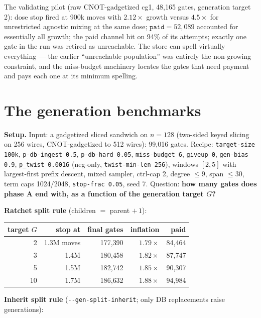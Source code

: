 \documentclass[11pt]{article}
\newcommand{\code}[1]{\texttt{#1}}
\begin{document}
The validating pilot (raw CNOT-gadgetized cg1, 48{,}165 gates, generation
target 2): dose stop fired at 900k moves with $2.12\times$ growth versus
$4.5\times$ for unrestricted agnostic mixing at the same dose;
$\code{paid}=52{,}089$ accounted for essentially all growth; the paid
channel hit on 94\% of its attempts; exactly one gate in the run was
retired as unreachable. The store can spell virtually everything --- the
earlier ``unreachable population'' was entirely the non-growing constraint,
and the miss-budget machinery locates the gates that need payment and pays
each one at its minimum spelling.

\section{The generation benchmarks}
\textbf{Setup.} Input: a gadgetized sliced sandwich on $n=128$ (two-sided
keyed slicing on 256 wires, CNOT-gadgetized to 512 wires): 99{,}016 gates.
Recipe: \code{target-size 100k}, \code{p-db-ingest 0.5},
\code{p-db-hard 0.05}, \code{miss-budget 6}, \code{giveup 0},
\code{gen-bias 0.9}, \code{p\_twist 0.0016} (neg-only,
\code{twist-min-len 256}), windows $[2,5]$ with largest-first prefix
descent, mixed sampler, ctrl-cap 2, degree $\leq 9$, span $\leq 30$, term
caps 1024/2048, \code{stop-frac 0.05}, seed 7. Question: \textbf{how many
gates does phase A end with, as a function of the generation target $G$?}

\medskip
\noindent\textbf{Ratchet split rule} (children $=$ parent $+\,1$):

\begin{center}
\begin{tabular}{rrrrr}
\toprule
target $G$ & stop at & final gates & inflation & paid \\
\midrule
2 & 1.3M moves & 177{,}390 & $1.79\times$ & 84{,}464 \\
3 & 1.4M & 180{,}458 & $1.82\times$ & 87{,}747 \\
5 & 1.5M & 182{,}742 & $1.85\times$ & 90{,}307 \\
10 & 1.7M & 186{,}632 & $1.88\times$ & 94{,}984 \\
\bottomrule
\end{tabular}
\end{center}

\noindent\textbf{Inherit split rule} (\code{-{}-gen-split-inherit}; only DB
replacements raise generations):
\end{document}
